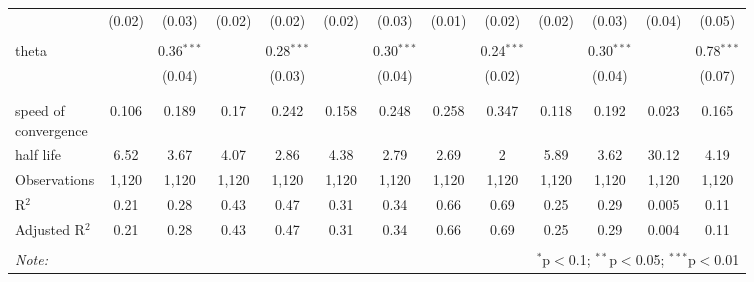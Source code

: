 \begin{sidewaystable}[!htbp]
\begin{tabular}{@{\extracolsep{0.1pt}}lcccccccccccc}
  & (0.02) & (0.03) & (0.02) & (0.02) & (0.02) & (0.03) & (0.01) & (0.02) & (0.02) & (0.03) & (0.04) & (0.05) \\ 
  & & & & & & & & & & & & \\ 
 theta &  & 0.36$^{***}$ &  & 0.28$^{***}$ &  & 0.30$^{***}$ &  & 0.24$^{***}$ &  & 0.30$^{***}$ &  & 0.78$^{***}$ \\ 
  &  & (0.04) &  & (0.03) &  & (0.04) &  & (0.02) &  & (0.04) &  & (0.07) \\ 
  & & & & & & & & & & & & \\ 
\hline \\[-1.8ex] 
\shortstack{speed of\\ convergence} & 0.106 & 0.189 & 0.17 & 0.242 & 0.158 & 0.248 & 0.258 & 0.347 & 0.118 & 0.192 & 0.023 & 0.165 \\ 
half life & 6.52 & 3.67 & 4.07 & 2.86 & 4.38 & 2.79 & 2.69 & 2 & 5.89 & 3.62 & 30.12 & 4.19 \\ 
Observations & 1,120 & 1,120 & 1,120 & 1,120 & 1,120 & 1,120 & 1,120 & 1,120 & 1,120 & 1,120 & 1,120 & 1,120 \\ 
R$^{2}$ & 0.21 & 0.28 & 0.43 & 0.47 & 0.31 & 0.34 & 0.66 & 0.69 & 0.25 & 0.29 & 0.005 & 0.11 \\ 
Adjusted R$^{2}$ & 0.21 & 0.28 & 0.43 & 0.47 & 0.31 & 0.34 & 0.66 & 0.69 & 0.25 & 0.29 & 0.004 & 0.11 \\ 
\hline 
\hline \\[-1.8ex] 
\textit{Note:}  & \multicolumn{12}{r}{$^{*}$p$<$0.1; $^{**}$p$<$0.05; $^{***}$p$<$0.01} \\ 
\end{tabular} 
\end{sidewaystable} 
